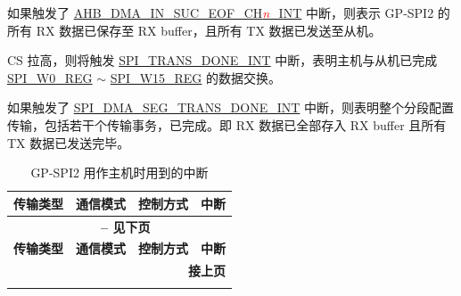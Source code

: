 \documentclass[main\_\_CN.tex]{subfiles}
\begin{document}
\begin{ThreePartTable}

\begin{TableNotes}
    \item[1] 如果触发了 \hyperref[int:GDMAINSUCEOFINT]{AHB\_DMA\_IN\_SUC\_EOF\_CH\textcolor{red}{\it{n}}\_INT} 中断，则表示 GP-SPI2 的所有 RX 数据已保存至 RX buffer，且所有 TX 数据已发送至从机。
    \item[2] CS 拉高，则将触发 \hyperref[int:SPITRANSDONEINT]{SPI\_TRANS\_DONE\_INT} 中断，表明主机与从机已完成 \hyperref[regdesc:SPIW0REG]{SPI\_W0\_REG} $\sim$ \hyperref[regdesc:SPIW15REG]{SPI\_W15\_REG} 的数据交换。
    \item[3] 如果触发了 \hyperref[int:SPIDMASEGTRANSDONEINT]{SPI\_DMA\_SEG\_TRANS\_DONE\_INT} 中断，则表明整个分段配置传输，包括若干个传输事务，已完成。即 RX 数据已全部存入 RX buffer 且所有 TX 数据已发送完毕。
\end{TableNotes}

\begin{longtable}[c]{|c|l|l|l|}
\caption{GP-SPI2 用作主机时用到的中断}
\label{tab:master-interrupts}\\
\hline
\rowcolor{lightgray}
\textbf{传输类型 } & \textbf{ 通信模式} & \textbf{ 控制方式} & \textbf{ 中断 } \\\hline
    \endfirsthead
    \multicolumn{4}{c}{\bfseries \tablename\ \thetable{} -- 见下页}\\\hline
    \rowcolor{lightgray}
    \textbf{传输类型 } & \textbf{ 通信模式} & \textbf{ 控制方式} & \textbf{ 中断 }\\\hline
    \endhead
    
    \multicolumn{4}{r}{\textbf{接上页}} \\
    \endfoot
    

\end{longtable}
\end{ThreePartTable}
\end{document}
